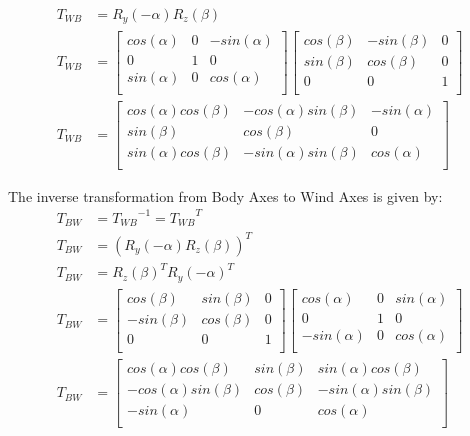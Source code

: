\begin{align}
    T_{WB} &= R_y(-\alpha) R_z(\beta) \\
    T_{WB} &=
    \begin{bmatrix}
        cos(\alpha)&    0&      -sin(\alpha)\\
        0&              1&      0\\
        sin(\alpha)&    0&      cos(\alpha)\\
    \end{bmatrix}
    \begin{bmatrix}
        cos(\beta)&   -sin(\beta)&    0\\
        sin(\beta)&    cos(\beta)&    0\\
        0&              0&            1\\
    \end{bmatrix}\\
    T_{WB} &=
    \begin{bmatrix}
        cos(\alpha)cos(\beta)&    -cos(\alpha)sin(\beta)&   -sin(\alpha)\\
        sin(\beta)&                cos(\beta)&               0\\
        sin(\alpha)cos(\beta)&    -sin(\alpha)sin(\beta)&   cos(\alpha)\\
    \end{bmatrix}
\end{align}

The inverse transformation from Body Axes to Wind Axes is given by:
\begin{align}
    T_{BW} &= {T_{WB}}^{-1} = {T_{WB}}^{T} \\
    T_{BW} &= (R_y(-\alpha) R_z(\beta))^T \\
    T_{BW} &= R_z(\beta)^T R_y(-\alpha)^T \\
    T_{BW} &=
    \begin{bmatrix}
        cos(\beta)&     sin(\beta)&    0\\
        -sin(\beta)&    cos(\beta)&    0\\
        0&              0&             1\\
    \end{bmatrix}
    \begin{bmatrix}
        cos(\alpha)&    0&      sin(\alpha)\\
        0&              1&      0\\
        -sin(\alpha)&   0&      cos(\alpha)\\
    \end{bmatrix}\\
    T_{BW} &=
    \begin{bmatrix}
        cos(\alpha)cos(\beta)&    sin(\beta)&   sin(\alpha)cos(\beta)\\
       -cos(\alpha)sin(\beta)&    cos(\beta)&  -sin(\alpha)sin(\beta)\\
       -sin(\alpha)&              0&            cos(\alpha)\\
    \end{bmatrix}
\end{align}


